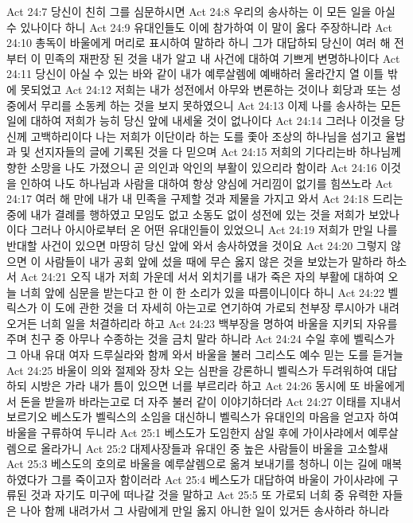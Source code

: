Act 24:7  당신이 친히 그를 심문하시면
Act 24:8  우리의 송사하는 이 모든 일을 아실 수 있나이다 하니
Act 24:9  유대인들도 이에 참가하여 이 말이 옳다 주장하니라
Act 24:10  총독이 바울에게 머리로 표시하여 말하라 하니 그가 대답하되 당신이 여러 해 전부터 이 민족의 재판장 된 것을 내가 알고 내 사건에 대하여 기쁘게 변명하나이다
Act 24:11  당신이 아실 수 있는 바와 같이 내가 예루살렘에 예배하러 올라간지 열 이틀 밖에 못되었고
Act 24:12  저희는 내가 성전에서 아무와 변론하는 것이나 회당과 또는 성중에서 무리를 소동케 하는 것을 보지 못하였으니
Act 24:13  이제 나를 송사하는 모든 일에 대하여 저희가 능히 당신 앞에 내세울 것이 없나이다
Act 24:14  그러나 이것을 당신께 고백하리이다 나는 저희가 이단이라 하는 도를 좇아 조상의 하나님을 섬기고 율법과 및 선지자들의 글에 기록된 것을 다 믿으며
Act 24:15  저희의 기다리는바 하나님께 향한 소망을 나도 가졌으니 곧 의인과 악인의 부활이 있으리라 함이라
Act 24:16  이것을 인하여 나도 하나님과 사람을 대하여 항상 양심에 거리낌이 없기를 힘쓰노라
Act 24:17  여러 해 만에 내가 내 민족을 구제할 것과 제물을 가지고 와서
Act 24:18  드리는 중에 내가 결례를 행하였고 모임도 없고 소동도 없이 성전에 있는 것을 저희가 보았나이다 그러나 아시아로부터 온 어떤 유대인들이 있었으니
Act 24:19  저희가 만일 나를 반대할 사건이 있으면 마땅히 당신 앞에 와서 송사하였을 것이요
Act 24:20  그렇지 않으면 이 사람들이 내가 공회 앞에 섰을 때에 무슨 옳지 않은 것을 보았는가 말하라 하소서
Act 24:21  오직 내가 저희 가운데 서서 외치기를 내가 죽은 자의 부활에 대하여 오늘 너희 앞에 심문을 받는다고 한 이 한 소리가 있을 따름이니이다 하니
Act 24:22  벨릭스가 이 도에 관한 것을 더 자세히 아는고로 연기하여 가로되 천부장 루시아가 내려 오거든 너희 일을 처결하리라 하고
Act 24:23  백부장을 명하여 바울을 지키되 자유를 주며 친구 중 아무나 수종하는 것을 금치 말라 하니라
Act 24:24  수일 후에 벨릭스가 그 아내 유대 여자 드루실라와 함께 와서 바울을 불러 그리스도 예수 믿는 도를 듣거늘
Act 24:25  바울이 의와 절제와 장차 오는 심판을 강론하니 벨릭스가 두려워하여 대답하되 시방은 가라 내가 틈이 있으면 너를 부르리라 하고
Act 24:26  동시에 또 바울에게서 돈을 받을까 바라는고로 더 자주 불러 같이 이야기하더라
Act 24:27  이태를 지내서 보르기오 베스도가 벨릭스의 소임을 대신하니 벨릭스가 유대인의 마음을 얻고자 하여 바울을 구류하여 두니라
Act 25:1  베스도가 도임한지 삼일 후에 가이사랴에서 예루살렘으로 올라가니
Act 25:2  대제사장들과 유대인 중 높은 사람들이 바울을 고소할새
Act 25:3  베스도의 호의로 바울을 예루살렘으로 옮겨 보내기를 청하니 이는 길에 매복하였다가 그를 죽이고자 함이러라
Act 25:4  베스도가 대답하여 바울이 가이사랴에 구류된 것과 자기도 미구에 떠나갈 것을 말하고
Act 25:5  또 가로되 너희 중 유력한 자들은 나아 함께 내려가서 그 사람에게 만일 옳지 아니한 일이 있거든 송사하라 하니라
